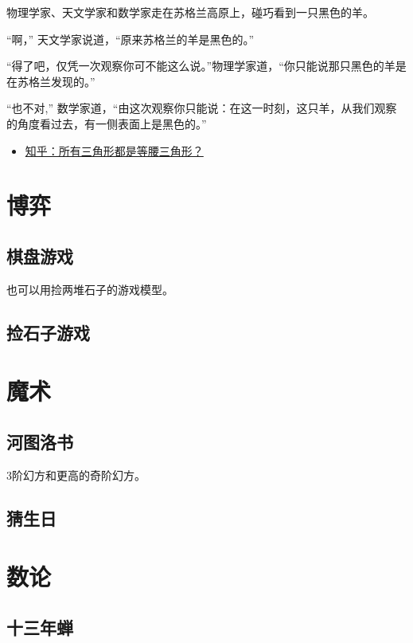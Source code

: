 \documentclass[12pt, letterpaper]{ctexrep}
\newenvironment{shadedquotation}
 {\begin{shaded*}
  \quoting[leftmargin=5pt, rightmargin=5pt, vskip=0pt]
 }
 {\endquoting
 \end{shaded*}
}
\begin{document}
\begin{shadedquotation}
\noindent
物理学家、天文学家和数学家走在苏格兰高原上，碰巧看到一只黑色的羊。
\noindent

\noindent
“啊，” 天文学家说道，“原来苏格兰的羊是黑色的。”
\noindent

\noindent
“得了吧，仅凭一次观察你可不能这么说。”物理学家道，“你只能说那只黑色的羊是在苏格兰发现的。”
\noindent

\noindent
“也不对,” 数学家道，“由这次观察你只能说：在这一时刻，这只羊，从我们观察的角度看过去，有一侧表面上是黑色的。”
\end{shadedquotation}



\begin{itemize}
\item{ \href{https://www.zhihu.com/question/34781603/answer/59948789}{知乎：所有三角形都是等腰三角形？} }
\end{itemize}





\chapter{博弈}


\section{棋盘游戏}
也可以用捡两堆石子的游戏模型。


\section{捡石子游戏}




\chapter{魔术}


\section{河图洛书}
3阶幻方和更高的奇阶幻方。


\section{猜生日}




\chapter{数论}


\section{十三年蝉}
\end{document}
